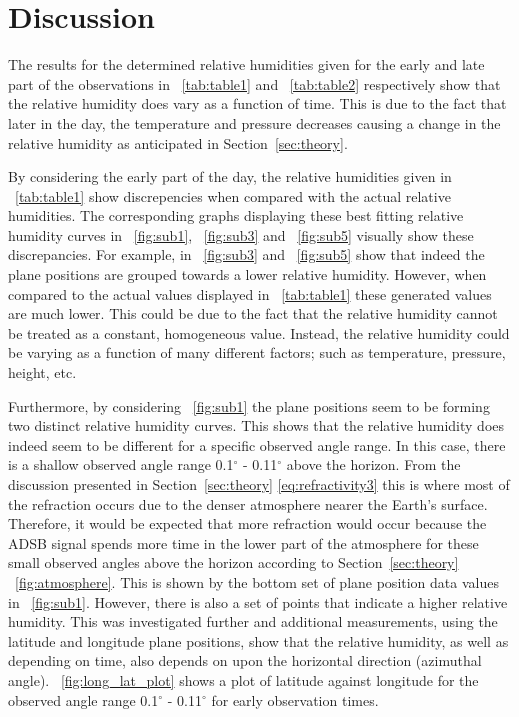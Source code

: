 \documentclass{article}
\newcommand{\figref}[2][\figurename~]{#1\ref{#2}}
\newcommand{\tabref}[2][\tablename~]{#1\ref{#2}}
\newcommand{\secref}[2][Section~]{#1\ref{#2}}
\begin{document}
\section{Discussion}
\label{sec:discussion}

The results for the determined relative humidities given for the early and late part of the observations in \tabref{tab:table1} and \tabref{tab:table2} respectively show that the relative humidity does vary as a function of time. This is due to the fact that later in the day, the temperature and pressure decreases causing a change in the relative humidity as anticipated in \secref{sec:theory}.

\vspace{2mm}
\noindent
By considering the early part of the day, the relative humidities given in \tabref{tab:table1} show discrepencies when compared with the actual relative humidities. The corresponding graphs displaying these best fitting relative humidity curves in \figref{fig:sub1}, \figref{fig:sub3} and \figref{fig:sub5} visually show these discrepancies. For example, in \figref{fig:sub3} and \figref{fig:sub5} show that indeed the plane positions are grouped towards a lower relative humidity. However, when compared to the actual values displayed in \tabref{tab:table1} these generated values are much lower. This could be due to the fact that the relative humidity cannot be treated as a constant, homogeneous value. Instead, the relative humidity could be varying as a function of many different factors; such as temperature, pressure, height, etc. 

\vspace{2mm}
\noindent
Furthermore, by considering \figref{fig:sub1} the plane positions seem to be forming two distinct relative humidity curves. This shows that the relative humidity does indeed seem to be different for a specific observed angle range. In this case, there is a shallow observed angle range 0.1$^{\circ}$ - 0.11$^{\circ}$ above the horizon. From the discussion presented in \secref{sec:theory} \eqref{eq:refractivity3} this is where most of the refraction occurs due to the denser atmosphere nearer the Earth's surface. Therefore, it would be expected that more refraction would occur because the ADSB signal spends more time in the lower part of the atmosphere for these small observed angles above the horizon according to \secref{sec:theory} \figref{fig:atmosphere}. This is shown by the bottom set of plane position data values in \figref{fig:sub1}. However, there is also a set of points that indicate a higher relative humidity. This was investigated further and additional measurements, using the latitude and longitude plane positions, show that the relative humidity, as well as depending on time, also depends on upon the horizontal direction (azimuthal angle). \figref{fig:long_lat_plot} shows a plot of latitude against longitude for the observed angle range 0.1$^{\circ}$ - 0.11$^{\circ}$ for early observation times.
\end{document}
